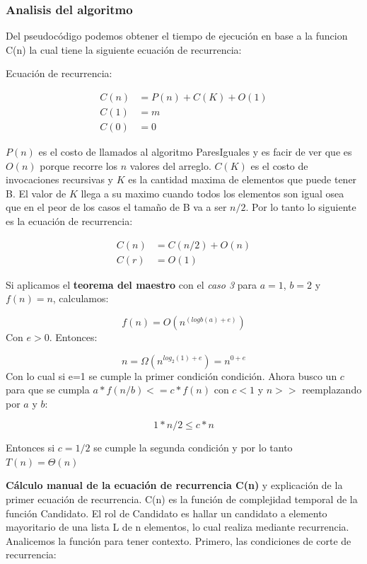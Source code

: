 \documentclass{article}
\begin{document}
\subsubsection{Analisis del algoritmo}

Del pseudocódigo podemos obtener el tiempo de ejecución en base a la funcion C(n) la cual tiene la siguiente ecuación de recurrencia:

Ecuación de recurrencia:

\begin{equation} \label{eq1}
    \begin{split}
        C(n) & = P(n) + C(K) + O(1) \\
        C(1) & = m \\
        C(0) & = 0
    \end{split} 
\end{equation}


\(P(n)\) es el costo de llamados al algoritmo ParesIguales y es facir de ver que es \(O(n)\) porque recorre los \(n\) valores del arreglo. 
\(C(K)\) es el costo de invocaciones recursivas y \(K\) es la cantidad maxima de elementos que puede tener B. 
El valor de \(K\) llega a su maximo cuando todos los elementos son igual osea que en el peor de los casos el tamaño de B va a ser \(n/2\). Por lo tanto lo siguiente es la ecuación de recurrencia:

\begin{equation} \label{eq1}
    \begin{split}
        C(n) &= C(n/2) + O(n) \\
        C(r) &= O(1)
    \end{split} 
\end{equation}


Si aplicamos el \textbf{teorema del maestro} con el \textit{caso 3} para \(a=1\), \(b=2\) y \(f(n)=n\), calculamos:

\[
    f(n) = O(n^{(logb(a) + e)}) 
\]
Con \(e>0\). Entonces:

\[
    n =  \Omega(n^{log_2(1) + e} ) = n^{0 + e}
\]
Con lo cual si e=1 se cumple la primer condición condición. Ahora busco un \(c\) para que se cumpla \(a*f(n/b) <= c*f(n)\) con \(c < 1\) y \(n>>\) reemplazando por \(a\) y \(b\):

\[
    1*n/2 \leq c * n    
\]

Entonces si \(c=1/2\) se cumple la segunda condición y por lo tanto \(T(n) = \Theta(n)\)

\textbf{Cálculo manual de la ecuación de recurrencia C(n)} y explicación de la primer ecuación de recurrencia.
C(n) es la función de complejidad temporal de la función Candidato. El rol de Candidato es hallar un candidato a elemento mayoritario de una lista L de n elementos, lo cual realiza mediante recurrencia. 
Analicemos la función para tener contexto. Primero, las condiciones de corte de recurrencia:
\end{document}
